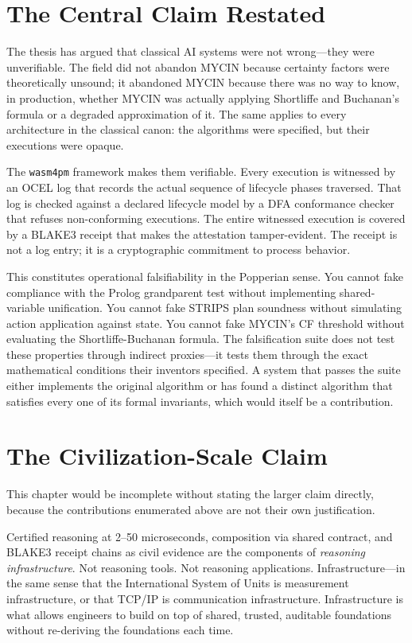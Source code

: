 \section{The Central Claim Restated}
\label{sec:central-claim}

The thesis has argued that classical AI systems were not wrong---they were unverifiable. The field did not abandon MYCIN because certainty factors were theoretically unsound; it abandoned MYCIN because there was no way to know, in production, whether MYCIN was actually applying Shortliffe and Buchanan's formula or a degraded approximation of it. The same applies to every architecture in the classical canon: the algorithms were specified, but their executions were opaque.

The \texttt{wasm4pm} framework makes them verifiable. Every execution is witnessed by an OCEL log that records the actual sequence of lifecycle phases traversed. That log is checked against a declared lifecycle model by a DFA conformance checker that refuses non-conforming executions. The entire witnessed execution is covered by a BLAKE3 receipt that makes the attestation tamper-evident. The receipt is not a log entry; it is a cryptographic commitment to process behavior.

This constitutes operational falsifiability in the Popperian sense. You cannot fake compliance with the Prolog grandparent test without implementing shared-variable unification. You cannot fake STRIPS plan soundness without simulating action application against state. You cannot fake MYCIN's CF threshold without evaluating the Shortliffe-Buchanan formula. The falsification suite does not test these properties through indirect proxies---it tests them through the exact mathematical conditions their inventors specified. A system that passes the suite either implements the original algorithm or has found a distinct algorithm that satisfies every one of its formal invariants, which would itself be a contribution.

\section{The Civilization-Scale Claim}
\label{sec:civilization}

This chapter would be incomplete without stating the larger claim directly, because the contributions enumerated above are not their own justification.

Certified reasoning at 2--50 microseconds, composition via shared contract, and BLAKE3 receipt chains as civil evidence are the components of \emph{reasoning infrastructure}. Not reasoning tools. Not reasoning applications. Infrastructure---in the same sense that the International System of Units is measurement infrastructure, or that TCP/IP is communication infrastructure. Infrastructure is what allows engineers to build on top of shared, trusted, auditable foundations without re-deriving the foundations each time.

